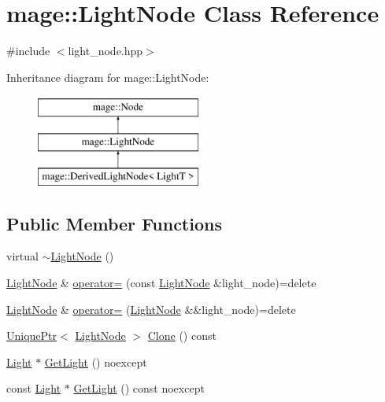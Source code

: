 \hypertarget{classmage_1_1_light_node}{}\section{mage\+:\+:Light\+Node Class Reference}
\label{classmage_1_1_light_node}


{\ttfamily \#include $<$light\+\_\+node.\+hpp$>$}

Inheritance diagram for mage\+:\+:Light\+Node\+:\begin{figure}[H]
\begin{center}
\leavevmode
\includegraphics[height=3.000000cm]{classmage_1_1_light_node}
\end{center}
\end{figure}
\subsection*{Public Member Functions}
\begin{DoxyCompactItemize}
\item 
virtual \hyperlink{classmage_1_1_light_node_ad0c650ac0059589c28a3d1cfec95c07d}{$\sim$\+Light\+Node} ()
\item 
\hyperlink{classmage_1_1_light_node}{Light\+Node} \& \hyperlink{classmage_1_1_light_node_a41e3ee25215ccc1cbaed4b73e393930a}{operator=} (const \hyperlink{classmage_1_1_light_node}{Light\+Node} \&light\+\_\+node)=delete
\item 
\hyperlink{classmage_1_1_light_node}{Light\+Node} \& \hyperlink{classmage_1_1_light_node_abda92f7cf2ce3aed3af94d2278e2bfa1}{operator=} (\hyperlink{classmage_1_1_light_node}{Light\+Node} \&\&light\+\_\+node)=delete
\item 
\hyperlink{namespacemage_a3316d7143a973e37adf1110f2e80ca31}{Unique\+Ptr}$<$ \hyperlink{classmage_1_1_light_node}{Light\+Node} $>$ \hyperlink{classmage_1_1_light_node_a4d0c10f03de71cd497635feb431d02d5}{Clone} () const
\item 
\hyperlink{classmage_1_1_light}{Light} $\ast$ \hyperlink{classmage_1_1_light_node_a2b971e64ec2267d49c2ba96a00662d3b}{Get\+Light} () noexcept
\item 
const \hyperlink{classmage_1_1_light}{Light} $\ast$ \hyperlink{classmage_1_1_light_node_a015453d1751cf3ad78846e972957bb5b}{Get\+Light} () const noexcept
\end{DoxyCompactItemize}
